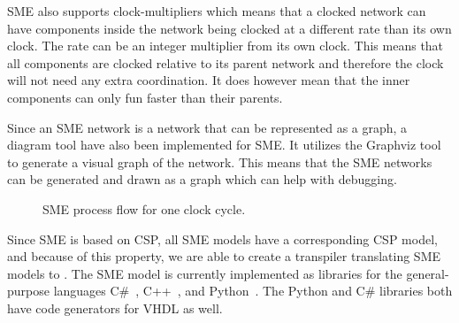 SME also supports clock-multipliers which means that a clocked network can have components inside the network being clocked at a different rate than its own clock. The rate can be an integer multiplier from its own clock. This means that all components are clocked relative to its parent network and therefore the clock will not need any extra coordination. It does however mean that the inner components can only fun faster than their parents.

Since an SME network is a network that can be represented as a graph, a diagram tool have also been implemented for SME. It utilizes the Graphviz tool to generate a visual graph of the network. This means that the SME networks can be generated and drawn as a graph which can help with debugging.


\begin{figure}[!ht]
  \centering
  \caption{SME process flow for one clock cycle.}
  \label{fig:sme_process_flow}
\end{figure}
Since SME is based on CSP, all SME models have a
corresponding CSP model, and because of this property, we are able to create a transpiler translating SME models to \cspm{}.
The SME model is currently implemented as libraries for the general-purpose languages C\#~\cite{Skovhede}, C++~\cite{asheim2015}, and Python~\cite{asheim2016vhdl}. The Python and C\# libraries both have code generators for VHDL as well.

